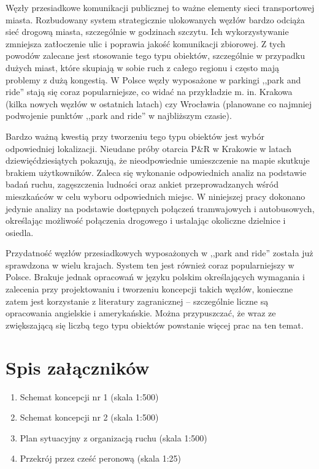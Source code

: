 \documentclass[twoside,12pt]{article}
\begin{document}
		Węzły przesiadkowe komunikacji publicznej to ważne elementy sieci transportowej miasta. Rozbudowany system strategicznie ulokowanych węzłów bardzo odciąża sieć drogową miasta, szczególnie w godzinach szczytu. Ich wykorzystywanie zmniejsza zatłoczenie ulic i poprawia jakość komunikacji zbiorowej. Z tych powodów zalecane jest stosowanie tego typu obiektów, szczególnie w przypadku dużych miast, które skupiają w sobie ruch z całego regionu i często mają problemy z dużą kongestią. W Polsce węzły wyposażone w parkingi ,,park and ride'' stają się coraz popularniejsze, co widać na przykładzie m. in. Krakowa (kilka nowych węzłów w ostatnich latach) czy Wrocławia (planowane co najmniej podwojenie punktów ,,park and ride'' w najbliższym czasie). 
		
		Bardzo ważną kwestią przy tworzeniu tego typu obiektów jest wybór odpowiedniej lokalizacji. Nieudane próby otarcia P\&{}R w Krakowie w latach dziewięćdziesiątych pokazują, że nieodpowiednie umieszczenie na mapie skutkuje brakiem użytkowników. Zaleca się wykonanie odpowiednich analiz na podstawie badań ruchu, zagęszczenia ludności oraz ankiet przeprowadzanych wśród mieszkańców w celu wyboru odpowiednich miejsc. W niniejszej pracy dokonano jedynie analizy na podstawie dostępnych połączeń tramwajowych i autobusowych, określając możliwość połączenia drogowego i ustalając okoliczne dzielnice i osiedla. 
		
		Przydatność węzłów przesiadkowych wyposażonych w ,,park and ride'' została już sprawdzona w wielu krajach. System ten jest również coraz popularniejszy w Polsce. Brakuje jednak opracowań w języku polskim określających wymagania i zalecenia przy projektowaniu i tworzeniu koncepcji takich węzłów, konieczne zatem jest korzystanie z literatury zagranicznej -- szczególnie liczne są opracowania angielskie i amerykańskie. Można przypuszczać, że wraz ze zwiększającą się liczbą tego typu obiektów powstanie więcej prac na ten temat. 
		
		
		
		
		
		
		
		

\listoffigures

\listoftables

\clearpage
{}
\small 

\vspace*{3em}


\section*{Spis załączników}


\begin{enumerate}
\item Schemat koncepcji nr 1 (skala 1:500)
\item Schemat koncepcji nr 2 (skala 1:500)
\item Plan sytuacyjny z organizacją ruchu (skala 1:500)
\item Przekrój przez cześć peronową (skala 1:25)
\end{enumerate}
\end{document}

